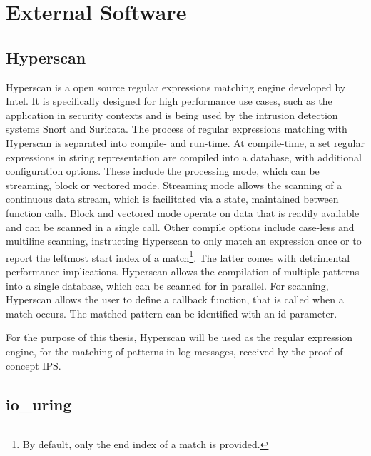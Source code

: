 \section{External Software} \label{sec:software}

\subsection{Hyperscan} \label{sec:hyperscan}
 
Hyperscan is a open source regular expressions matching engine developed by Intel. 
It is specifically designed for high performance use cases, such as the application in security contexts and is being used by the intrusion detection systems Snort and Suricata.  
The process of regular expressions matching with Hyperscan is separated into compile- and run-time. At compile-time, a set regular expressions in string representation are compiled into a 
database, with additional configuration options. These include the processing mode, which 
can be streaming, block or vectored mode. Streaming mode allows the scanning of a continuous data stream,
which is facilitated via a state, maintained between function calls. Block and vectored mode operate on data
that is readily available and can be scanned in a single call. Other compile options include 
case-less and multiline scanning, instructing Hyperscan to only match an expression
once or to report the leftmost start index of a match\footnote{By default, only the end index of a match is provided.}. The latter comes with detrimental performance implications.
Hyperscan allows the compilation
of multiple patterns into a single database, which can be scanned for in parallel. 
For scanning, Hyperscan allows the user to define a callback function, that is 
called when a match occurs. The matched pattern can be identified with an id parameter. \cite{hyperscan}
\par 
For the purpose of this thesis, Hyperscan will be used as the regular expression engine, for
the matching of patterns in log messages, received by the proof of concept \ac{IPS}.    

\subsection{io\_uring} \label{sec:io_uring}

